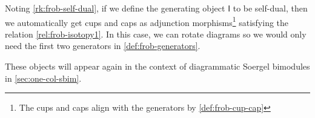 \begin{remark}
    Noting \autoref{rk:frob-self-dual}, if we define the generating object $\mathsf{I}$ to be self-dual, then we automatically get cups and caps as adjunction morphisms\footnote{The cups and caps align with the generators by \eqref{def:frob-cup-cap}} satisfying the relation \eqref{rel:frob-isotopy1}. In this case, we can rotate diagrams so we would only need the first two generators in \eqref{def:frob-generators}.
\end{remark}

These objects will appear again in the context of diagrammatic Soergel bimodules in \autoref{sec:one-col-sbim}.
